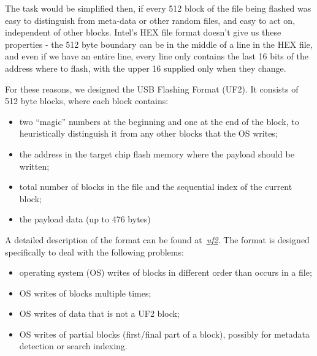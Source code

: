 The task would be simplified then, if every 512 block of the file being flashed was easy to distinguish from meta-data
or other random files, and easy to act on, independent of other blocks. Intel's HEX file format doesn't give us these properties 
- the 512 byte boundary can be in the middle of a line in the HEX file, and even if we have an entire line, every line only
contains the last 16 bits of the address where to flash, with the upper 16 supplied only when they change.

%

For these reasons, we designed the USB Flashing Format (UF2). It consists of 512 byte blocks, where each block contains:
\begin{itemize}
\item two ``magic'' numbers at the beginning and one at the end of the block,
to heuristically distinguish it from any other blocks that the OS writes;
\item the address in the target chip flash memory where the payload should be written;
\item total number of blocks in the file and the sequential index of the current block;
\item the payload data (up to 476 bytes)
\end{itemize}
A detailed description of the format can be found at~\emph{\href{https://github.com/microsoft/uf2}{uf2}}.
The format is designed specifically to deal with the following problems:
\begin{itemize}
\item operating system (OS) writes of blocks in different order than occurs in a file;
\item OS writes of blocks multiple times;
\item OS writes of data that is not a UF2 block;
\item OS writes of partial blocks (first/final part of a block), possibly for metadata detection or search indexing.
\end{itemize}

